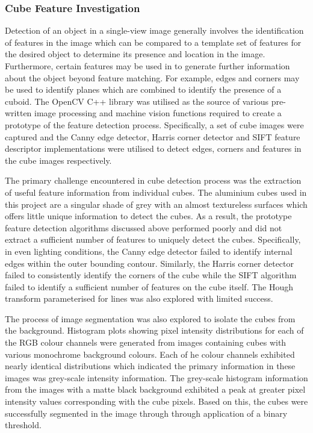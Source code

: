 \subsubsection{Cube Feature Investigation}

Detection of an object in a single-view image generally involves the identification of features in the image which can be compared to a template set of features for the desired object to determine its presence and location in the image. Furthermore, certain features may be used in to generate further information about the object beyond feature matching. For example, edges and corners may be used to identify planes which are combined to identify the presence of a cuboid. The OpenCV C++ library was utilised as the source of various pre-written image processing and machine vision functions required to create a prototype of the feature detection process. Specifically, a set of cube images were captured and the Canny edge detector, Harris corner detector and SIFT feature descriptor implementations were utilised to detect edges, corners and features in the cube images respectively. 

The primary challenge encountered in cube detection process was the extraction of useful feature information from individual cubes. The aluminium cubes used in this project are a singular shade of grey with an almost textureless surfaces which offers little unique information to detect the cubes. As a result, the prototype feature detection algorithms discussed above performed poorly and did not extract a sufficient number of features to uniquely detect the cubes. Specifically, in even lighting conditions, the Canny edge detector failed to identify internal edges within the outer bounding contour. Similarly, the Harris corner detector failed to consistently identify the corners of the cube while the SIFT algorithm failed to identify a sufficient number of features on the cube itself. The Hough transform parameterised for lines was also explored with limited success.  

The process of image segmentation was also explored to isolate the cubes from the background. Histogram plots showing pixel intensity distributions for each of the RGB colour channels were generated from images containing cubes with various monochrome background colours. Each of he colour channels exhibited nearly identical distributions which indicated the primary information in these images was grey-scale intensity information. The grey-scale histogram information from the images with a matte black background exhibited a peak at greater pixel intensity values corresponding with the cube pixels. Based on this, the cubes were successfully segmented in the image through through application of a binary threshold. 

